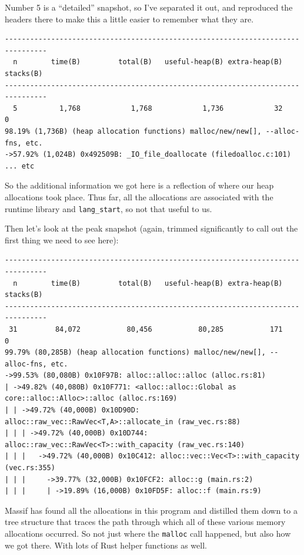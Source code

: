 Number 5 is a ``detailed'' snapshot, so I've separated it out, and reproduced the headers there to make this a little easier to remember what they are.

{
\begin{verbatim}
--------------------------------------------------------------------------------
  n        time(B)         total(B)   useful-heap(B) extra-heap(B)    stacks(B)
--------------------------------------------------------------------------------
  5          1,768            1,768            1,736            32            0
98.19% (1,736B) (heap allocation functions) malloc/new/new[], --alloc-fns, etc.
->57.92% (1,024B) 0x492509B: _IO_file_doallocate (filedoalloc.c:101)
... etc
\end{verbatim}
}

So the additional information we got here is a reflection of where our heap allocations took place. Thus far, all the allocations are associated with the runtime library and {\tt lang\_start}, so not that useful to us.

Then let's look at the peak snapshot (again, trimmed significantly to call out the first thing we need to see here):

{
\begin{verbatim}
--------------------------------------------------------------------------------
  n        time(B)         total(B)   useful-heap(B) extra-heap(B)    stacks(B)
--------------------------------------------------------------------------------
 31         84,072           80,456           80,285           171            0
99.79% (80,285B) (heap allocation functions) malloc/new/new[], --alloc-fns, etc.
->99.53% (80,080B) 0x10F97B: alloc::alloc::alloc (alloc.rs:81)
| ->49.82% (40,080B) 0x10F771: <alloc::alloc::Global as core::alloc::Alloc>::alloc (alloc.rs:169)
| | ->49.72% (40,000B) 0x10D90D: alloc::raw_vec::RawVec<T,A>::allocate_in (raw_vec.rs:88)
| | | ->49.72% (40,000B) 0x10D744: alloc::raw_vec::RawVec<T>::with_capacity (raw_vec.rs:140)
| | |   ->49.72% (40,000B) 0x10C412: alloc::vec::Vec<T>::with_capacity (vec.rs:355)
| | |     ->39.77% (32,000B) 0x10FCF2: alloc::g (main.rs:2)
| | |     | ->19.89% (16,000B) 0x10FD5F: alloc::f (main.rs:9)
\end{verbatim}
}

Massif has found all the allocations in this program and distilled them down to a tree structure that traces the path through which all of these various memory allocations occurred. So not just where the \texttt{malloc} call happened, but also how we got there. With lots of Rust helper functions as well.

